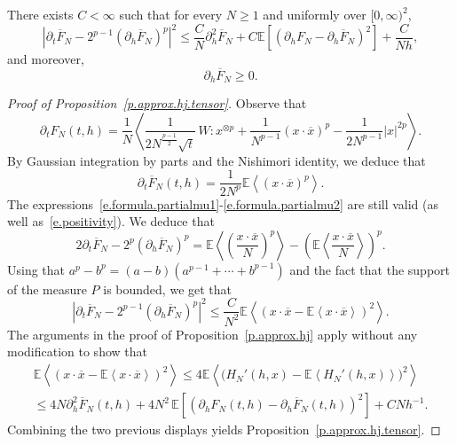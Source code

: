 \documentclass[AHL,Unicode,longabstracts,published]{cedram}
\newcommand{\E}{\mathbb{E}}
\newcommand{\1}{\mathds{1}}
\renewcommand{\le}{\leqslant}
\renewcommand{\ge}{\geqslant}
\newcommand{\la}{\left\langle}
\newcommand{\ra}{\right\rangle}
\renewcommand{\bar}{\overline}
\begin{document}
\begin{prop}\label{p.approx.hj.tensor}
There exists $C < \infty$ such that for every $N \ge 1$ and uniformly over $[0,\infty)^2$,
\[
\left|\partial_t \bar F_N - 2^{p-1}\left(\partial_{h} \bar F_N\right)^p\right|^2 \le \frac{C}{N} \partial_{h}^2 \bar F_N + C\E \left[\left(\partial_h F_N - \partial_h \bar F_N\right)^2 \right] +\frac{C}{Nh},
\]
and moreover,
\begin{equation}\label{e.boundary.tensor}
\partial_h \bar F_N\ge 0.
\end{equation}
\end{prop}


\begin{proof}[Proof of Proposition~\ref{p.approx.hj.tensor}]
Observe that
\begin{equation}\label{e.formula.partialt.tensor}
\partial_t F_N(t,{h}) = \frac 1 N\la \frac {1} {2N^{\frac{p-1}{2}}\sqrt {t}} \, W : x^{\otimes p} + \frac 1 {N^{p-1}} (x\cdot \bar x)^p - \frac 1 {2N^{p-1}} |x|^{2p} \ra.
\end{equation}
By Gaussian integration by parts and the Nishimori identity, we deduce that
\[
\partial_t \bar F_N(t,{h}) = \frac 1 {2N^{p}} \E \la (x \cdot \bar x)^p \ra.
\]
The expressions~\eqref{e.formula.partialmu1}-\eqref{e.formula.partialmu2} are still valid (as well as~\eqref{e.positivity}). We deduce that
\begin{equation}\label{e.variance.identity.tensor}
2\partial_t \bar F_N - 2^{p} \left(\partial_{h} \bar F_N\right)^p = \E \la \left(\frac{x \cdot \bar x}{N}\right)^p\ra - \left(\E \la \frac{x \cdot \bar x}{N}\ra \right)^p.
\end{equation}
Using that $a^p - b^p = (a-b)(a^{p-1} + \cdots + b^{p-1})$ and the fact that the support of the measure $P$ is bounded, we get that
\[
\left|\partial_t \bar F_N - 2^{p-1} \left(\partial_{h} \bar F_N\right)^p \right|^2 \le \frac{C}{N^2} \E \la \left(x\cdot \bar x - \E\la x\cdot \bar x \ra \right)^2 \ra.
\]
The arguments in the proof of Proposition~\ref{p.approx.hj} apply without any modification to show that
\begin{multline*}
\E \la \left(x\cdot \bar x - \E\la x\cdot \bar x \ra \right)^2 \ra  \le 4 \E \la \big(H_N'(h,x) - \E \la H_N'(h,x) \ra \big) ^2 \ra \\
\le 4N \partial_h^2 \bar F_N(t,h) + 4N^2 \, \E \left[\left(\partial_h F_N(t,h) - \partial_h \bar F_N(t,h) \right) ^2 \right]+ C N h^{-1}.
\end{multline*}
Combining the two previous displays yields Proposition~\ref{p.approx.hj.tensor}.
\end{proof}
\end{document}

